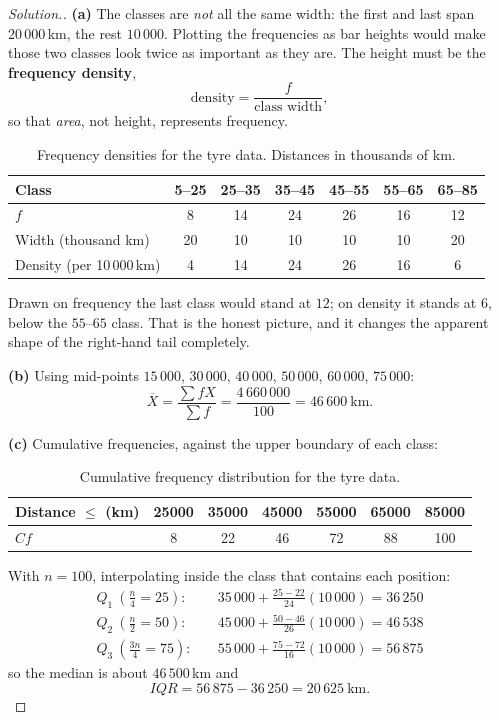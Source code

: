\documentclass[11pt,a4paper]{article}
\theoremstyle{definition}
\newenvironment{solution}
  {\renewcommand{\qedsymbol}{}\begin{proof}[\textit{Solution}.]}
  {\end{proof}}
\begin{document}
\begin{solution}
\textbf{(a)} The classes are \emph{not} all the same width: the first and last span
$20\,000$\,km, the rest $10\,000$. Plotting the frequencies as bar heights would make those
two classes look twice as important as they are. The height must be the \textbf{frequency
density},
\[\text{density}=\frac{f}{\text{class width}},\]
so that \emph{area}, not height, represents frequency.
\begin{table}[H]
\centering
\begin{tabular}{|l|c|c|c|c|c|c|}
\hline
Class & 5--25 & 25--35 & 35--45 & 45--55 & 55--65 & 65--85\\
\hline
$f$ & 8 & 14 & 24 & 26 & 16 & 12\\
Width (thousand km) & 20 & 10 & 10 & 10 & 10 & 20\\
Density (per 10\,000\,km) & 4 & 14 & 24 & 26 & 16 & 6\\
\hline
\end{tabular}
\caption{Frequency densities for the tyre data. Distances in thousands of km.}
\end{table}
Drawn on frequency the last class would stand at $12$; on density it stands at $6$, below
the $55$--$65$ class. That is the honest picture, and it changes the apparent shape of the
right-hand tail completely.

\textbf{(b)} Using mid-points $15\,000$, $30\,000$, $40\,000$, $50\,000$, $60\,000$,
$75\,000$:
\[\overline{X}=\frac{\sum fX}{\sum f}=\frac{4\,660\,000}{100}=46\,600\ \text{km}.\]

\textbf{(c)} Cumulative frequencies, against the upper boundary of each class:
\begin{table}[H]
\centering
\begin{tabular}{|l|c|c|c|c|c|c|}
\hline
Distance $\leq$ (km) & 25000 & 35000 & 45000 & 55000 & 65000 & 85000\\
\hline
$Cf$ & 8 & 22 & 46 & 72 & 88 & 100\\
\hline
\end{tabular}
\caption{Cumulative frequency distribution for the tyre data.}
\end{table}
With $n=100$, interpolating inside the class that contains each position:
\begin{align*}
Q_1\ \left(\tfrac{n}{4}=25\right):&\quad 35\,000+\frac{25-22}{24}(10\,000)=36\,250\\
Q_2\ \left(\tfrac{n}{2}=50\right):&\quad 45\,000+\frac{50-46}{26}(10\,000)=46\,538\\
Q_3\ \left(\tfrac{3n}{4}=75\right):&\quad 55\,000+\frac{75-72}{16}(10\,000)=56\,875
\end{align*}
so the median is about $46\,500$\,km and
\[IQR=56\,875-36\,250=20\,625\ \text{km}.\]


\end{solution}
\end{document}
